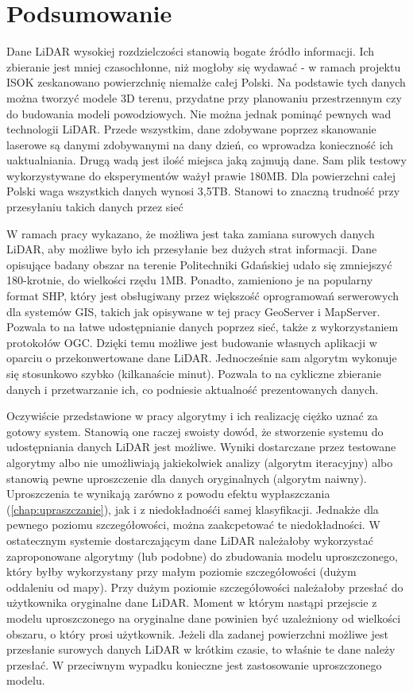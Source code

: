 \chapter{Podsumowanie}

Dane LiDAR wysokiej rozdzielczości stanowią bogate źródło informacji.
Ich zbieranie jest mniej czasochłonne, niż mogłoby się wydawać - w ramach projektu
ISOK zeskanowano powierzchnię niemalże całej Polski. Na podstawie tych danych można
tworzyć modele 3D terenu, przydatne przy planowaniu przestrzennym czy do budowania
modeli powodziowych. Nie można jednak pominąć pewnych wad technologii LiDAR. Przede
wszystkim, dane zdobywane poprzez skanowanie laserowe są danymi zdobywanymi na dany
dzień, co wprowadza konieczność ich uaktualniania. Drugą wadą jest ilość miejsca jaką
zajmują dane. Sam plik testowy wykorzystywane do eksperymentów ważył prawie 180MB.
Dla powierzchni całej Polski waga wszystkich danych wynosi 3,5TB. Stanowi to znaczną
trudność przy przesyłaniu takich danych przez sieć

W ramach pracy wykazano, że możliwa jest taka zamiana surowych danych LiDAR, aby
możliwe było ich przesyłanie bez dużych strat informacji. Dane opisujące badany 
obszar na terenie Politechniki Gdańskiej udało się zmniejszyć 180-krotnie, do
wielkości rzędu 1MB. Ponadto, zamieniono je na popularny format SHP, który jest
obsługiwany przez większość oprogramowań serwerowych dla systemów GIS, takich
jak opisywane w tej pracy GeoServer i MapServer. Pozwala to na łatwe udostępnianie
danych poprzez sieć, także z wykorzystaniem protokołów OGC. Dzięki temu
możliwe jest budowanie własnych aplikacji w oparciu o przekonwertowane dane LiDAR.
Jednocześnie sam algorytm wykonuje się stosunkowo szybko (kilkanaście minut). Pozwala
to na cykliczne zbieranie danych i przetwarzanie ich, co podniesie aktualność prezentowanych
danych.

Oczywiście przedstawione w pracy algorytmy i ich realizację ciężko uznać za gotowy
system. Stanowią one raczej swoisty dowód, że stworzenie systemu do udostępniania
danych LiDAR jest możliwe. Wyniki dostarczane przez testowane algorytmy albo nie
umożliwiają jakiekolwiek analizy (algorytm iteracyjny) albo stanowią pewne uproszczenie
dla danych oryginalnych (algorytm naiwny). Uproszczenia te wynikają zarówno z powodu
efektu wypłaszczania (\autoref{chap:upraszczanie}), jak i z niedokładnośći samej
klasyfikacji. Jednakże dla pewnego poziomu szczegółowości, można zaakcpetować te
niedokładności. W ostatecznym systemie dostarczającym dane LiDAR należałoby wykorzystać
zaproponowane algorytmy (lub podobne) do zbudowania modelu uproszczonego, który
byłby wykorzystany przy małym poziomie szczegółowości (dużym oddaleniu od mapy).
Przy dużym poziomie szczegółowości należałoby przesłać do użytkownika oryginalne
dane LiDAR. Moment w którym nastąpi przejscie z modelu uproszczonego na oryginalne
dane powinien być uzależniony od wielkości obszaru, o który prosi użytkownik. Jeżeli
dla zadanej powierzchni możliwe jest przesłanie surowych danych LiDAR w krótkim czasie,
to właśnie te dane należy przesłać. W przeciwnym wypadku konieczne jest zastosowanie
uproszczonego modelu.

